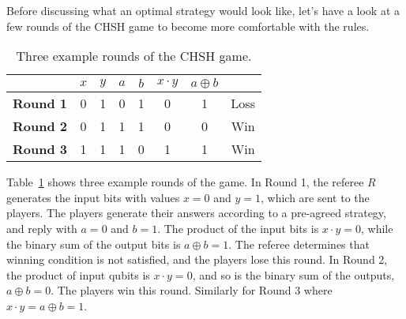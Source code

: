 Before discussing what an optimal strategy would look like, let's have a look at a few rounds of the CHSH game to become more comfortable with the rules.
\begin{table}[h]
    \setcellgapes{5pt}
    \renewcommand\theadfont{}
    \makegapedcells
    \centering
    \begin{tabular}{cccccccc}
        \hline
        & $x$ & $y$ & $a$ & $b$ & $x\cdot y$ & $a\oplus b$ \\
        \hline
        \textbf{Round 1} & 0 & 1 & 0 & 1 & 0 & 1 & \textcolor{myred}{Loss} \\
        \textbf{Round 2} & 0 & 1 & 1 & 1 & 0 & 0 & \textcolor{mygreen}{Win} \\
        \textbf{Round 3} & 1 & 1 & 1 & 0 & 1 & 1 & \textcolor{mygreen}{Win} \\
        \hline
    \end{tabular}
    \caption[CHSH game example.]{Three example rounds of the CHSH game.}
    \label{tab:4-1_chsh_rounds}
\end{table}
Table~\ref{tab:4-1_chsh_rounds} shows three example rounds of the game.
In Round 1, the referee $R$ generates the input bits with values $x=0$ and $y=1$, which are sent to the players.
The players generate their answers according to a pre-agreed strategy, and reply with $a=0$ and $b=1$.
The product of the input bits is $x\cdot y=0$, while the binary sum of the output bits is $a\oplus b=1$.
The referee determines that winning condition is not satisfied, and the players lose this round.
In Round 2, the product of input qubits is $x\cdot y=0$, and so is the binary sum of the outputs, $a\oplus b=0$. The players win this round.
Similarly for Round 3 where $x\cdot y=a\oplus b=1$.


